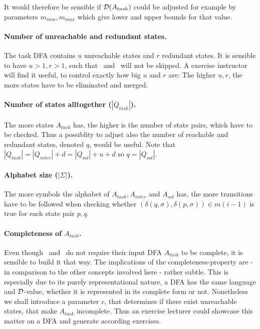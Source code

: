 It would therefore be sensible if $\mathcal{D}(A_{task})$ could be adjusted for example by parameters $m_{min}, m_{max}$ which give lower and upper bounds for that value.

\paragraph*{Number of unreachable and redundant states.}

The task DFA contains $u$ unreachable states and $r$ redundant states. It is sensible to have $u > 1, r > 1$, such that \RemUnr\ and \RemEq\ will not be skipped. A exercise instructor will find it useful, to control exactly how big $u$ and $r$ are: The higher $u, r$, the more states have to be eliminated and merged.

\paragraph*{Number of states alltogether ($|Q_{task}|$).}

The more states $A_{task}$ has, the higher is the number of state pairs, which have to be checked. Thus a possiblity to adjust also the number of reachable and redundant states, denoted $q$, would be useful. Note that $|Q_{task}| = |Q_{inter}| + d = |Q_{sol}| + u + d$ so $q = |Q_{sol}|$.

\paragraph*{Alphabet size ($|\Sigma|$).}

The more symbols the alphabet of $A_{task}, A_{inter}$ and $A_{sol}$ has, the more transitions have to be followed when checking whether $(\delta(q,\sigma),\delta(p,\sigma))\in m(i-1)$ is true for each state pair $p,q$.

\paragraph*{Completeness of $A_{task}$.}

Even though \CompUnr\ and \RemUnr\ do not require their input DFA $A_{task}$ to be complete, it is sensible to build it that way. The implications of the completeness-property are - in comparison to the other concepts involved here - rather subtle. This is especially due to its purely representational nature, a DFA has the same language and $\mathcal{D}$-value, whether it is represented in its complete form or not. Nonetheless we shall introduce a parameter $c$, that determines if there exist unreachable states, that make $A_{task}$ incomplete. Thus an exercise lecturer could showcase this matter on a DFA and generate according exercises.

